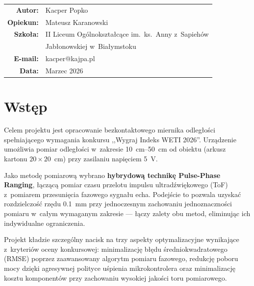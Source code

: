 \documentclass[a4paper,11pt]{article}
\begin{document}
\begin{titlepage}
    \vfill

    {\large
    \begin{tabular}{rl}
        \textbf{Autor:}  & Kacper Popko \\
        \textbf{Opiekun:}  & Mateusz Karanowski \\
        \textbf{Szkoła:}  & II Liceum Ogólnokształcące im.\ ks.\ Anny z~Sapiehów \\
                          & Jabłonowskiej w~Białymstoku \\
        \textbf{E-mail:}  & kacper@kajpa.pl \\
        \textbf{Data:}    & Marzec 2026 \\
    \end{tabular}
    }

    \vspace{1cm}
\end{titlepage}

\tableofcontents
\newpage

\section{Wstęp}
\label{sec:wstep}

Celem projektu jest opracowanie bezkontaktowego miernika odległości spełniającego
wymagania konkursu ,,Wygraj Indeks WETI 2026''. Urządzenie umożliwia pomiar
odległości w~zakresie \SIrange{10}{50}{\centi\metre} od obiektu (arkusz kartonu
$20 \times 20$~\si{\centi\metre}) przy zasilaniu napięciem \SI{5}{\volt}.

Jako metodę pomiarową wybrano \textbf{hybrydową technikę Pulse-Phase Ranging},
łączącą pomiar czasu przelotu impulsu ultradźwiękowego (ToF) z~pomiarem
przesunięcia fazowego sygnału echa. Podejście to pozwala uzyskać rozdzielczość
rzędu \SI{0,1}{\milli\metre} przy jednoczesnym zachowaniu jednoznaczności pomiaru
w~całym wymaganym zakresie --- łączy zalety obu metod, eliminując ich indywidualne
ograniczenia.

Projekt kładzie szczególny nacisk na trzy aspekty optymalizacyjne wynikające
z~kryteriów oceny konkursowej: minimalizację błędu średniokwadratowego (RMSE)
poprzez zaawansowany algorytm pomiaru fazowego, redukcję poboru mocy dzięki
agresywnej polityce uśpienia mikrokontrolera oraz minimalizację kosztu
komponentów przy zachowaniu wysokiej jakości toru pomiarowego.
\end{document}
